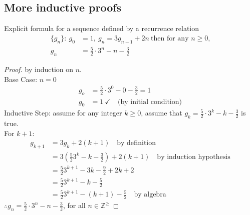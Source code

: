 \subsection{More inductive proofs}
Explicit formula for a sequence defined by a recurrence relation
\begin{align*}
  \{g_n\}:~g_0 & =1,~g_n=3g_{n-1} + 2n~\text{then for any $n \geq 0$,} \\
  g_n          & = \frac{5}{2} \cdot 3^n - n - \frac{3}{2}
\end{align*}
\begin{proof}
  by induction on $n$. \\
  Base Case: $n=0$
  \begin{align*}
    g_o & = \frac{5}{2} \cdot 3^0 - 0 - \frac{3}{2} = 1    \\
    g_0 & = 1~\checkmark\quad\text{(by initial condition)}
  \end{align*}
  Inductive Step: assume for any integer $k\geq0$, assume that $g_k=\frac{5}{2} \cdot 3^k-k-\frac{3}{2}$ is true.\\
  For $k+1$:
  \begin{align*}
    g_{k+1} & = 3g_{k} + 2(k+1)\quad\text{by definition}                                  \\
            & = 3(\frac{5}{2}3^k-k-\frac{3}{2})+2(k+1)\quad\text{by induction hypothesis} \\
            & = \frac{5}{2}3^{k+1}-3k-\frac{9}{2}+2k+2                                    \\
            & = \frac{5}{2}3^{k+1}-k-\frac{5}{2}                                          \\
            & = \frac{5}{2}3^{k+1}-(k+1)-\frac{5}{2}\quad\text{by algebra}
  \end{align*}
  $\therefore g_n = \frac{5}{2} \cdot 3^n - n - \frac{3}{2}$, for all $n \in \mathbb{Z}^\geq$
\end{proof}

